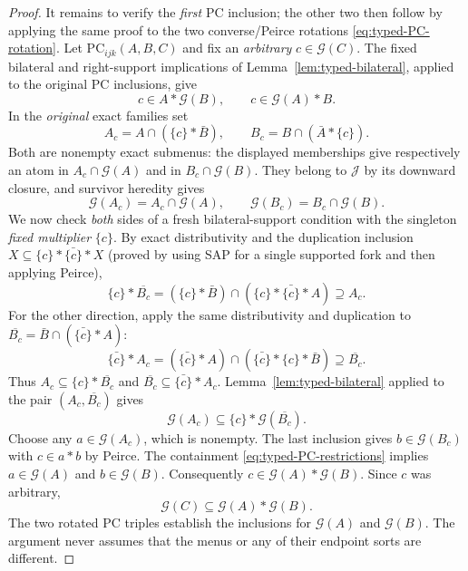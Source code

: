 \begin{proof}
It remains to verify the \emph{first} PC inclusion; the other two
then follow by applying the same proof to the two converse/Peirce
rotations \eqref{eq:typed-PC-rotation}.
Let $\mathrm{PC}_{ijk}(A,B,C)$ and fix an \emph{arbitrary}
$c\in\mathcal G(C)$.  The fixed bilateral and right-support
implications of Lemma~\ref{lem:typed-bilateral}, applied to the
original PC inclusions, give
\[
 c\in A*\mathcal G(B),\qquad c\in\mathcal G(A)*B.
\]
In the \emph{original} exact families set
\[
 A_c=A\cap(\{c\}*\bar B),\qquad
 B_c=B\cap(\bar A*\{c\}).
\]
Both are nonempty exact submenus: the displayed memberships give
respectively an atom in $A_c\cap\mathcal G(A)$ and in
$B_c\cap\mathcal G(B)$.  They belong to $\mathcal J$ by its
downward closure, and survivor heredity gives
\begin{equation}\label{eq:typed-PC-restrictions}
 \mathcal G(A_c)=A_c\cap\mathcal G(A),\qquad
 \mathcal G(B_c)=B_c\cap\mathcal G(B).
\end{equation}
We now check \emph{both} sides of a fresh bilateral-support
condition with the singleton \emph{fixed multiplier} $\{c\}$.
By exact distributivity and the duplication inclusion
$X\subseteq\{c\}*\bar{\{c\}}*X$ (proved by using SAP for a
single supported fork and then applying Peirce),
\[
 \{c\}*\overline{B_c}
  =(\{c\}*\bar B)\cap
    (\{c\}*\bar{\{c\}}*A)
 \supseteq A_c.
\]
For the other direction, apply the same distributivity and
duplication to $\overline{B_c}=\bar B\cap
(\bar{\{c\}}*A)$:
\[
 \bar{\{c\}}*A_c
  =(\bar{\{c\}}*A)\cap
    (\bar{\{c\}}*\{c\}*\bar B)
 \supseteq\overline{B_c}.
\]
Thus $A_c\subseteq\{c\}*\overline{B_c}$ and
$\overline{B_c}\subseteq\bar{\{c\}}*A_c$.
Lemma~\ref{lem:typed-bilateral} applied to the pair
$(A_c,\overline{B_c})$ gives
\[
 \mathcal G(A_c)\subseteq\{c\}*\mathcal G(\overline{B_c}).
\]
Choose any $a\in\mathcal G(A_c)$, which is nonempty.  The last
inclusion gives $b\in\mathcal G(B_c)$ with
$c\in a*b$ by Peirce.  The containment
\eqref{eq:typed-PC-restrictions} implies
$a\in\mathcal G(A)$ and $b\in\mathcal G(B)$.
Consequently $c\in\mathcal G(A)*\mathcal G(B)$.
Since $c$ was arbitrary,
\[
 \mathcal G(C)\subseteq\mathcal G(A)*\mathcal G(B).
\]
The two rotated PC triples establish the inclusions for
$\mathcal G(A)$ and $\mathcal G(B)$.  The argument never assumes
that the menus or any of their endpoint sorts are different.
\end{proof}

